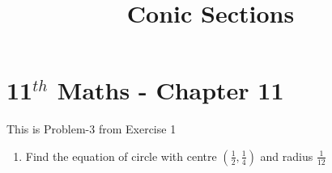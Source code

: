 \documentclass[12pt]{article}
\providecommand{\brak}[1]{\ensuremath{\left(#1\right)}}
\begin{document}
\begin{center}
\enlargethispage{-4cm}
\title{\textbf{Conic Sections}}
\date{\vspace{-5ex}} %
\maketitle
\end{center}
\setcounter{page}{1}
\section*{11$^{th}$ Maths - Chapter 11}
This is Problem-3 from Exercise 1
\begin{enumerate}
	\item Find the equation of circle with centre $\brak{\frac{1}{2},\frac{1}{4}}$ and radius $\frac{1}{12}$


\end{enumerate}
\end{document}
